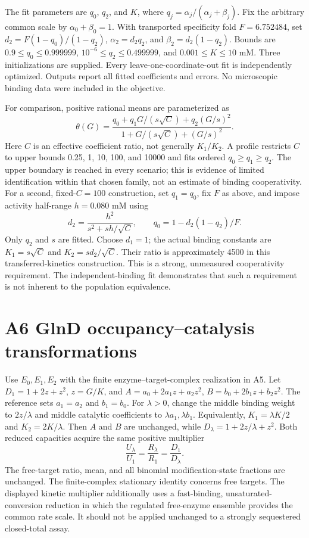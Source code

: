 \documentclass[11pt]{article}
\begin{document}
The fit parameters are $q_0$, $q_2$, and $K$, where $q_j=\alpha_j/(\alpha_j+\beta_j)$. Fix the arbitrary common scale by $\alpha_0+\beta_0=1$. With transported specificity fold $F=6.752484$, set $d_2=F(1-q_0)/(1-q_2)$, $\alpha_2=d_2q_2$, and $\beta_2=d_2(1-q_2)$. Bounds are $0.9\le q_0\le0.999999$, $10^{-6}\le q_2\le0.499999$, and $0.001\le K\le10$ mM. Three initializations are supplied. Every leave-one-coordinate-out fit is independently optimized. Outputs report all fitted coefficients and errors. No microscopic binding data were included in the objective.

For comparison, positive rational means are parameterized as
\[
\theta(G)=\frac{q_0+q_1G/(s\sqrt C)+q_2(G/s)^2}{1+G/(s\sqrt C)+(G/s)^2}.
\]
Here $C$ is an effective coefficient ratio, not generally $K_1/K_2$. A profile restricts $C$ to upper bounds 0.25, 1, 10, 100, and 10000 and fits ordered $q_0\ge q_1\ge q_2$. The upper boundary is reached in every scenario; this is evidence of limited identification within that chosen family, not an estimate of binding cooperativity. For a second, fixed-$C=100$ construction, set $q_1=q_0$, fix $F$ as above, and impose activity half-range $h=0.080$ mM using
\[
d_2=\frac{h^2}{s^2+sh/\sqrt C},\qquad q_0=1-d_2(1-q_2)/F.
\]
Only $q_2$ and $s$ are fitted. Choose $d_1=1$; the actual binding constants are $K_1=s\sqrt C$ and $K_2=sd_2/\sqrt C$. Their ratio is approximately 4500 in this transferred-kinetics construction. This is a strong, unmeasured cooperativity requirement. The independent-binding fit demonstrates that such a requirement is not inherent to the population equivalence.

\section*{A6 GlnD occupancy--catalysis transformations}

Use $E_0,E_1,E_2$ with the finite enzyme--target-complex realization in A5. Let $D_1=1+2z+z^2$, $z=G/K$, and $A=a_0+2a_1z+a_2z^2$, $B=b_0+2b_1z+b_2z^2$. The reference sets $a_1=a_2$ and $b_1=b_0$. For $\lambda>0$, change the middle binding weight to $2z/\lambda$ and middle catalytic coefficients to $\lambda a_1,\lambda b_1$. Equivalently, $K_1=\lambda K/2$ and $K_2=2K/\lambda$. Then $A$ and $B$ are unchanged, while $D_\lambda=1+2z/\lambda+z^2$. Both reduced capacities acquire the same positive multiplier
\[
\frac{U_\lambda}{U_1}=\frac{R_\lambda}{R_1}
=\frac{D_1}{D_\lambda}.
\]
The free-target ratio, mean, and all binomial modification-state fractions are unchanged. The finite-complex stationary identity concerns free targets. The displayed kinetic multiplier additionally uses a fast-binding, unsaturated-conversion reduction in which the regulated free-enzyme ensemble provides the common rate scale. It should not be applied unchanged to a strongly sequestered closed-total assay.
\end{document}
